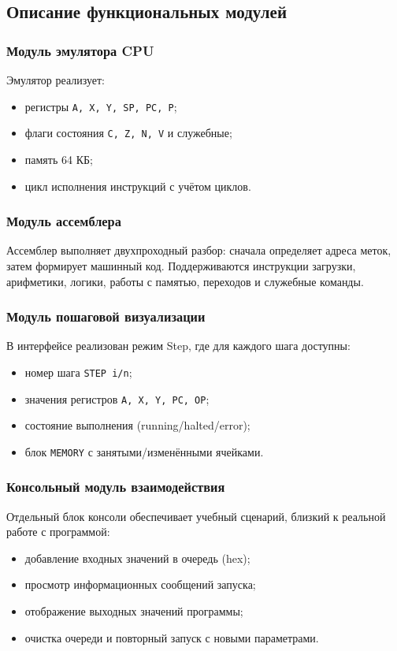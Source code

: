 \documentclass[12pt,a4paper]{article}
\begin{document}
\subsection{Описание функциональных модулей}
\subsubsection{Модуль эмулятора CPU}
Эмулятор реализует:
\begin{itemize}
  \item регистры \texttt{A, X, Y, SP, PC, P};
  \item флаги состояния \texttt{C, Z, N, V} и служебные;
  \item память 64 КБ;
  \item цикл исполнения инструкций с учётом циклов.
\end{itemize}

\subsubsection{Модуль ассемблера}
Ассемблер выполняет двухпроходный разбор: сначала определяет адреса меток, затем формирует машинный код. Поддерживаются инструкции загрузки, арифметики, логики, работы с памятью, переходов и служебные команды.

\subsubsection{Модуль пошаговой визуализации}
В интерфейсе реализован режим Step, где для каждого шага доступны:
\begin{itemize}
  \item номер шага \texttt{STEP i/n};
  \item значения регистров \texttt{A, X, Y, PC, OP};
  \item состояние выполнения (running/halted/error);
  \item блок \texttt{MEMORY} с занятыми/изменёнными ячейками.
\end{itemize}

\subsubsection{Консольный модуль взаимодействия}
Отдельный блок консоли обеспечивает учебный сценарий, близкий к реальной работе с программой:
\begin{itemize}
  \item добавление входных значений в очередь (hex);
  \item просмотр информационных сообщений запуска;
  \item отображение выходных значений программы;
  \item очистка очереди и повторный запуск с новыми параметрами.
\end{itemize}
\end{document}
